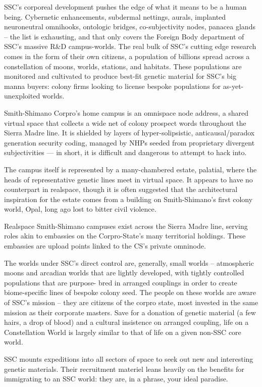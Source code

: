 SSC's corporeal development pushes the edge of what it means to be a human being.
Cybernetic enhancements, subdermal nettings, aurals, implanted neuroneutral omnihooks,
ontologic bridges, co-subjectivity nodes, panacea glands -- the list is exhausting, and that only
covers the Foreign Body department of SSC's massive R\&D campus-worlds. The real bulk of
SSC's cutting edge research comes in the form of their own citizens, a population of billions
spread across a constellation of moons, worlds, stations, and habitats. These populations are
monitored and cultivated to produce best-fit genetic material for SSC's big manna buyers:
colony firms looking to license bespoke populations for as-yet-unexploited worlds.

Smith-Shimano Corpro's home campus is an omnispace node address, a shared virtual space
that collects a wide net of colony prospect words throughout the Sierra Madre line. It is shielded
by layers of hyper-solipsistic, anticausal/paradox generation security coding, managed by NHPs
seeded from proprietary divergent subjectivities — in short, it is difficult and dangerous to
attempt to hack into.

The campus itself is represented by a many-chambered estate, palatial, where the heads of
representative genetic lines meet in virtual space. It appears to have no counterpart in realspace,
though it is often suggested that the architectural inspiration for the estate comes from a building
on Smith-Shimano's first colony world, Opal, long ago lost to bitter civil violence.

Realspace Smith-Shimano campuses exist across the Sierra Madre line, serving roles akin to
embassies on the Corpro-State's many territorial holdings. These embassies are upload points
linked to the CS's private omninode.

The worlds under SSC's direct control are, generally, small worlds -- atmospheric moons and
arcadian worlds that are lightly developed, with tightly controlled populations that are purpose-
bred in arranged couplings in order to create biome-specific lines of bespoke colony seed. The
people on these worlds are aware of SSC's mission -- they are citizens of the corpro state, most
invested in the same mission as their corporate masters. Save for a donation of genetic material
(a few hairs, a drop of blood) and a cultural insistence on arranged coupling, life on a
Constellation World is largely similar to that of life on a given non-SSC core world.

SSC mounts expeditions into all sectors of space to seek out new and interesting genetic
materials. Their recruitment materiel leans heavily on the benefits for immigrating to an SSC
world: they are, in a phrase, your ideal paradise.

